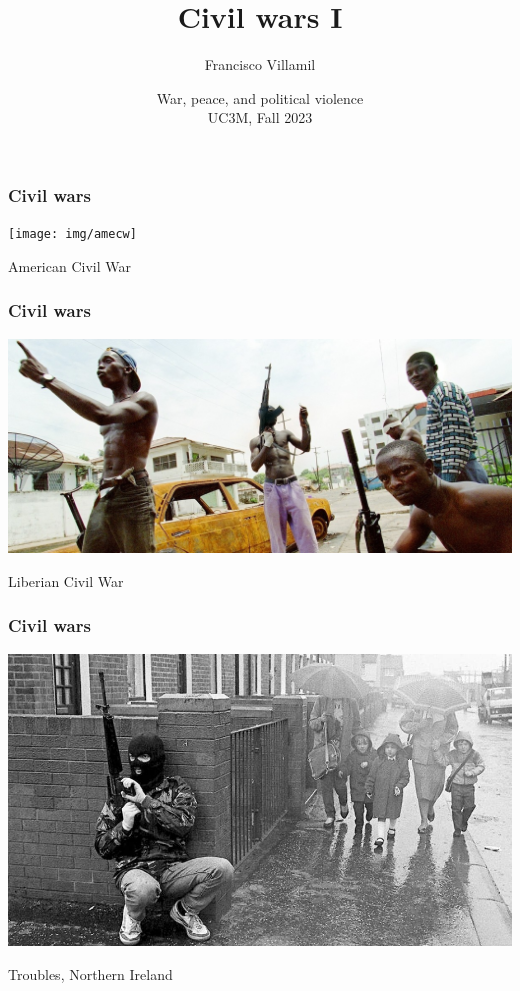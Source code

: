 \documentclass[aspectratio=43]{beamer}
\title{\huge Civil wars I}
\author{Francisco Villamil}
\date{War, peace, and political violence\\UC3M, Fall 2023}
\begin{document}
\begin{frame}
  \titlepage
\end{frame}


\begin{frame}
\frametitle{Civil wars}
\centering

\texttt{[image: img/amecw]}

American Civil War

\end{frame}

\begin{frame}
\frametitle{Civil wars}
\centering

\includegraphics[width = \textwidth]{img/liberia}

Liberian Civil War

\end{frame}

\begin{frame}
\frametitle{Civil wars}
\centering

\includegraphics[width = \textwidth]{img/troubles}

Troubles, Northern Ireland

\end{frame}
\end{document}
